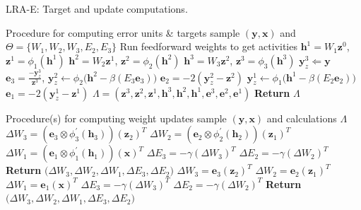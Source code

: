 \documentclass[letterpaper]{article} %
\begin{document}
\begin{algorithm}[H]
\caption{LRA-E: Target and update computations.}
\label{alg:lra_e}
\begin{algorithmic}
   \LineComment Procedure for computing error units \& targets
    sample $(\mathbf{y},\mathbf{x})$ and $ \Theta = \{ W_1, W_2, W_3, E_2, E_3 \}$
   		\LineComment Run feedforward weights to get activities
    	\State $\mathbf{h}^1 = W_1 \mathbf{z}^0$, $\mathbf{z}^1 = \phi_1(\mathbf{h}^1) $
    	\State $\mathbf{h}^2 = W_2 \mathbf{z}^1$, $\mathbf{z}^2 = \phi_2(\mathbf{h}^2) $
        \State $\mathbf{h}^3 = W_3 \mathbf{z}^2$, $\mathbf{z}^3 = \phi_3(\mathbf{h}^3) $
        \State $\mathbf{y}^3_z \Leftarrow \mathbf{y}$
        \State $\mathbf{e}_3 = \frac{-\mathbf{y}^3_z}{\mathbf{z}^3} $, $\mathbf{y}^2_z \leftarrow \phi_2 \Big( \mathbf{h}^2 - \beta ( E_3 \mathbf{e}_3 ) \Big)$
        \State $\mathbf{e}_2 = -2 ( \mathbf{y}^2_z - \mathbf{z}^2 ) $
        \State $\mathbf{y}^1_z \leftarrow \phi_1 \Big( \mathbf{h}^1 - \beta ( E_2 \mathbf{e}_2 ) \Big)$
        \State $\mathbf{e}_1 = -2 ( \mathbf{y}^1_z - \mathbf{z}^1 ) $
        \State $\Lambda = (\mathbf{z}^3,\mathbf{z}^2,\mathbf{z}^1,\mathbf{h}^3,\mathbf{h}^2,\mathbf{h}^1,\mathbf{e}^3,\mathbf{e}^2,\mathbf{e}^1)$
        \State \textbf{Return} $\Lambda$
    \EndFunction
\end{algorithmic}
\begin{algorithmic}
   \LineComment Procedure(s) for computing weight updates
    sample $(\mathbf{y},\mathbf{x})$  and calculations $\Lambda$
   		\State $\Delta W_3 = (\mathbf{e}_3 \otimes  \phi^\prime_3(\mathbf{h}_3) ) (\mathbf{z}_2)^T$
        \State $\Delta W_2 = (\mathbf{e}_2 \otimes  \phi^\prime_2(\mathbf{h}_2) ) (\mathbf{z}_1)^T$
        \State $\Delta W_1 = (\mathbf{e}_1 \otimes  \phi^\prime_1(\mathbf{h}_1) ) (\mathbf{x})^T$
        \State $ \Delta E_3 = -\gamma (\Delta W_3)^T $
        \State $ \Delta E_2 = -\gamma (\Delta W_2)^T $
        \State \textbf{Return} $ \big( \Delta W_3,\Delta W_2,\Delta W_1,\Delta E_3,\Delta E_2 \big) $
    \EndFunction
        \State $\Delta W_3 = \mathbf{e}_3 (\mathbf{z}_2)^T$
        \State $\Delta W_2 = \mathbf{e}_2 (\mathbf{z}_1)^T$
        \State $\Delta W_1 = \mathbf{e}_1 (\mathbf{x})^T$
        \State $ \Delta E_3 = -\gamma (\Delta W_3)^T $
        \State $ \Delta E_2 = -\gamma (\Delta W_2)^T $
        \State \textbf{Return} $ \big( \Delta W_3,\Delta W_2,\Delta W_1,\Delta E_3,\Delta E_2 \big) $
    \EndFunction
\end{algorithmic}
\end{algorithm}
\end{document}
